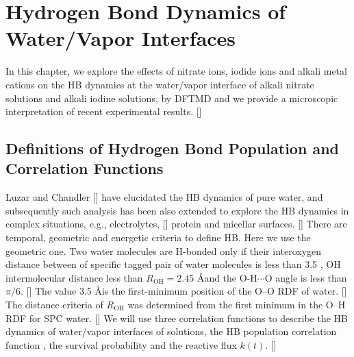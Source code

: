 \chapter{Hydrogen Bond Dynamics of Water/Vapor Interfaces }\label{CHAPTER_HB}
In this chapter, we explore the effects of nitrate ions, iodide ions and alkali metal cations 
on the HB dynamics at the water/vapor interface of alkali nitrate solutions and alkali
iodine solutions, by DFTMD 
and we provide a microscopic interpretation of recent experimental results. [\cite{HuaWei2014}]

\section{Definitions of Hydrogen Bond Population and Correlation Functions}
Luzar and Chandler [\cite{AL96}] have elucidated the HB dynamics of pure water, and
subsequently such analysis has been also extended to explore the HB dynamics
in complex situations, e.g., electrolytes, [\cite{AC00}] protein and  micellar surfaces. [\cite{SP05}]
There are temporal, geometric and energetic criteria to define HB. Here we use the geometric one.
Two water molecules are H-bonded only if their interoxygen distance between of specific tagged pair of water molecules 
is less than 3.5 \A, OH intermolecular distance less than $R_{\text{OH}}=2.45$ \AA and 
the O-H$\cdots$O angle is less than $\pi/6$. [\cite{AKS86,JT90,SB02}] 
The value 3.5 \AA is the first-minimum position of the O--O RDF of water. [\cite{Sciortino1989}]   
The distance criteria of $R_{\text{OH}}$  was determined from the first minimum in the O--H RDF for SPC water. [\cite{HJCB81}]
We will use three correlation functions to describe the HB dynamics of water/vapor interfaces of solutions,
the HB population correlation function \CHB, the survival probability \SHB and the reactive flux $k(t)$. [\cite{DCR83}]

